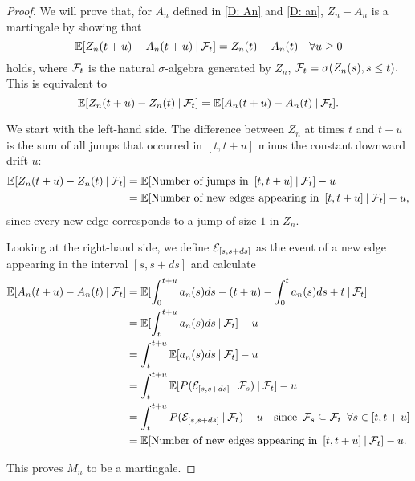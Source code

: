 \begin{proof} \label{P: decomp Zn}
	We will prove that, for $A_n$ defined in \ref{D: An} and \ref{D: an},
	$Z_n - A_n$
	is a martingale by showing that
	\begin{equation} \label{E: Mn martingale}
	\mathbb{E}[ Z_n(t+u) - A_n(t+u) \: | \: \mathcal{F}_{t} ] = Z_n(t) - A_n(t) \quad \forall u \geq 0
	\end{equation}
	holds, where $\mathcal{F}_{t}$ is the natural $\sigma$-algebra generated by $Z_n$, 
	$\mathcal{F}_{t} = \sigma(Z_n(s), s \leq t).$
	This is equivalent to 
	\begin{equation}
	\mathbb{E}[Z_n(t+u) - Z_n(t) \: | \: \mathcal{F}_{t}] = \mathbb{E}[A_n(t+u) - A_n(t) \: | \: \mathcal{F}_{t}].
	\end{equation}
	
	We start with the left-hand side. 
	The difference between $Z_n$ at times $t$ and $t+u$ is the sum of all jumps that occurred in $[t, t+u]$ minus the constant downward drift $u$:
	\begin{align*}
	\mathbb{E}[Z_n(t+u) - Z_n(t) \: | \: \mathcal{F}_{t}] 
	&= \mathbb{E}[\text{Number of jumps in} \enspace [t, t+u] \: | \: \mathcal{F}_{t}] - u \\
	&= \mathbb{E}[\text{Number of new edges appearing in} \enspace [t, t+u] \: | \: \mathcal{F}_{t}] - u,
	\end{align*}
	since every new edge corresponds to a jump of size $1$ in $Z_n$.
	
	Looking at the right-hand side, we define $\mathcal{E}_{[s,s+ds]}$ as the event of a new edge appearing in the interval $[s,s+ds]$ and calculate
	\begin{align*}
	\mathbb{E}[A_n(t+u) - A_n(t) \: | \: \mathcal{F}_{t}]
	&= \mathbb{E}[ \int_{0}^{t+u} a_n(s)ds - (t+u) - \int_{0}^{t} a_n(s)ds + t \: | \: \mathcal{F}_{t} ] \\
	&= \mathbb{E}[ \int_{t}^{t+u} a_n(s)ds \: | \: \mathcal{F}_{t} ] - u \\
	&= \int_{t}^{t+u} \mathbb{E}[a_n(s)ds \: | \: \mathcal{F}_{t}] - u \\
	&= \int_{t}^{t+u} \mathbb{E}[ P(\mathcal{E}_{[s,s+ds]} \: | \: \mathcal{F}_{s}) \: | \: \mathcal{F}_{t} ] - u\\
	&= \int_{t}^{t+u} P( \mathcal{E}_{[s,s+ds]} \: | \: \mathcal{F}_{t} ) - u
	\quad \text{since} \enspace \mathcal{F}_{s} \subseteq \mathcal{F}_{t} \enspace \forall s \in [t,t+u] \\
	&= \mathbb{E}[\text{Number of new edges appearing in} \enspace [t, t+u] \: | \: \mathcal{F}_{t}] - u.
	\end{align*}
	
	This proves $M_n$ to be a martingale. 	
\end{proof}


